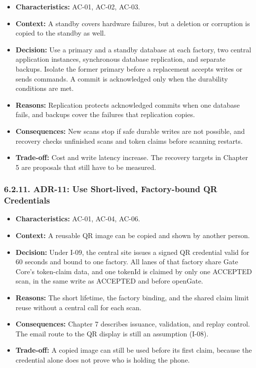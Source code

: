\begin{itemize}[leftmargin=36pt, itemsep=2pt, topsep=4pt, parsep=2pt]
  \item \textbf{Characteristics:} AC-01, AC-02, AC-03.
  \item \textbf{Context:} A standby covers hardware failures, but a deletion or corruption is copied to the standby as well.
  \item \textbf{Decision:} Use a primary and a standby database at each factory, two central application instances, synchronous database replication, and separate backups. Isolate the former primary before a replacement accepts writes or sends commands. A commit is acknowledged only when the durability conditions are met.
  \item \textbf{Reasons:} Replication protects acknowledged commits when one database fails, and backups cover the failures that replication copies.
  \item \textbf{Consequences:} New scans stop if safe durable writes are not possible, and recovery checks unfinished scans and token claims before scanning restarts.
  \item \textbf{Trade-off:} Cost and write latency increase. The recovery targets in Chapter 5 are proposals that still have to be measured.
\end{itemize}

\subsubsection*{6.2.11. ADR-11: Use Short-lived, Factory-bound QR Credentials}

{}

\begin{itemize}[leftmargin=36pt, itemsep=2pt, topsep=4pt, parsep=2pt]
  \item \textbf{Characteristics:} AC-01, AC-04, AC-06.
  \item \textbf{Context:} A reusable QR image can be copied and shown by another person.
  \item \textbf{Decision:} Under I-09, the central site issues a signed QR credential valid for 60 seconds and bound to one factory. All lanes of that factory share Gate Core's token-claim data, and one tokenId is claimed by only one ACCEPTED scan, in the same write as ACCEPTED and before openGate.
  \item \textbf{Reasons:} The short lifetime, the factory binding, and the shared claim limit reuse without a central call for each scan.
  \item \textbf{Consequences:} Chapter 7 describes issuance, validation, and replay control. The email route to the QR display is still an assumption (I-08).
  \item \textbf{Trade-off:} A copied image can still be used before its first claim, because the credential alone does not prove who is holding the phone.
\end{itemize}

